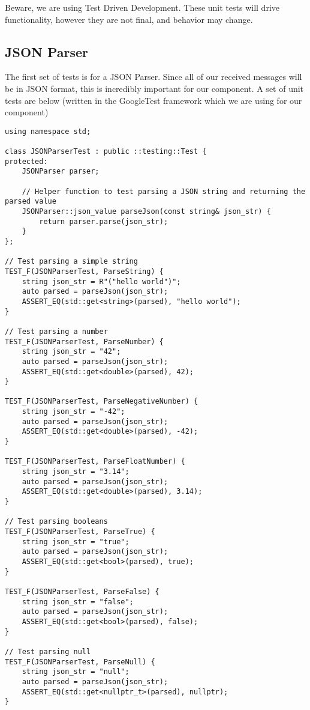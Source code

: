 Beware, we are using Test Driven Development. These unit tests will drive functionality, however they are not final, and behavior may change.

\subsection*{JSON Parser}

The first set of tests is for a JSON Parser. Since all of our received messages will be in JSON format, this is incredibly important for our component. A set of unit tests are below (written in the GoogleTest framework which we are using for our component)

\begin{verbatim}
using namespace std;

class JSONParserTest : public ::testing::Test {
protected:
    JSONParser parser;

    // Helper function to test parsing a JSON string and returning the parsed value
    JSONParser::json_value parseJson(const string& json_str) {
        return parser.parse(json_str);
    }
};

// Test parsing a simple string
TEST_F(JSONParserTest, ParseString) {
    string json_str = R"("hello world")";
    auto parsed = parseJson(json_str);
    ASSERT_EQ(std::get<string>(parsed), "hello world");
}

// Test parsing a number
TEST_F(JSONParserTest, ParseNumber) {
    string json_str = "42";
    auto parsed = parseJson(json_str);
    ASSERT_EQ(std::get<double>(parsed), 42);
}

TEST_F(JSONParserTest, ParseNegativeNumber) {
    string json_str = "-42";
    auto parsed = parseJson(json_str);
    ASSERT_EQ(std::get<double>(parsed), -42);
}

TEST_F(JSONParserTest, ParseFloatNumber) {
    string json_str = "3.14";
    auto parsed = parseJson(json_str);
    ASSERT_EQ(std::get<double>(parsed), 3.14);
}

// Test parsing booleans
TEST_F(JSONParserTest, ParseTrue) {
    string json_str = "true";
    auto parsed = parseJson(json_str);
    ASSERT_EQ(std::get<bool>(parsed), true);
}

TEST_F(JSONParserTest, ParseFalse) {
    string json_str = "false";
    auto parsed = parseJson(json_str);
    ASSERT_EQ(std::get<bool>(parsed), false);
}

// Test parsing null
TEST_F(JSONParserTest, ParseNull) {
    string json_str = "null";
    auto parsed = parseJson(json_str);
    ASSERT_EQ(std::get<nullptr_t>(parsed), nullptr);
}


\end{verbatim}
